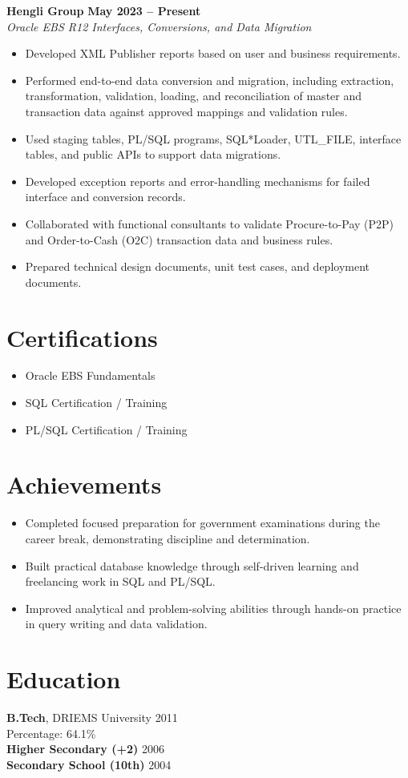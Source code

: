 \documentclass[11pt,a4paper]{article}
\begin{document}
\noindent\textbf{Hengli Group} \hfill \textbf{May 2023 -- Present}\\
\textit{Oracle EBS R12 Interfaces, Conversions, and Data Migration}
\begin{itemize}
    \item Developed XML Publisher reports based on user and business requirements.
    \item Performed end-to-end data conversion and migration, including extraction, transformation, validation, loading, and reconciliation of master and transaction data against approved mappings and validation rules.
    \item Used staging tables, PL/SQL programs, SQL*Loader, UTL_FILE, interface tables, and public APIs to support data migrations.
    \item Developed exception reports and error-handling mechanisms for failed interface and conversion records.
    \item Collaborated with functional consultants to validate Procure-to-Pay (P2P) and Order-to-Cash (O2C) transaction data and business rules.
    \item Prepared technical design documents, unit test cases, and deployment documents.
\end{itemize}

\section*{Certifications}
\begin{itemize}
    \item Oracle EBS Fundamentals
    \item SQL Certification / Training
    \item PL/SQL Certification / Training
\end{itemize}

\section*{Achievements}
\begin{itemize}
    \item Completed focused preparation for government examinations during the career break, demonstrating discipline and determination.
    \item Built practical database knowledge through self-driven learning and freelancing work in SQL and PL/SQL.
    \item Improved analytical and problem-solving abilities through hands-on practice in query writing and data validation.
\end{itemize}

\section*{Education}
\textbf{B.Tech}, DRIEMS University \hfill 2011\\
Percentage: 64.1\%\\[4pt]
\textbf{Higher Secondary (+2)} \hfill 2006\\[4pt]
\textbf{Secondary School (10th)} \hfill 2004
\end{document}

